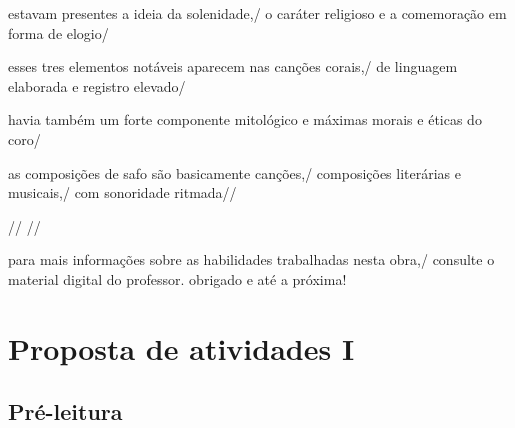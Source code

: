 \documentclass[12pt]{extarticle}
\begin{document}
estavam presentes a ideia da solenidade,/ o caráter religioso e a comemoração em forma de elogio/

esses tres elementos notáveis aparecem nas canções corais,/ de linguagem elaborada e registro elevado/

havia também um forte componente mitológico e máximas morais e éticas do coro/

as composições de safo são basicamente canções,/ composições literárias e musicais,/ com sonoridade ritmada//

 //
//
 
para mais informações sobre as habilidades trabalhadas nesta obra,/ consulte o material digital do professor. obrigado e até a próxima!


\section{Proposta de atividades I}


\subsection{Pré-leitura}






\end{document}
